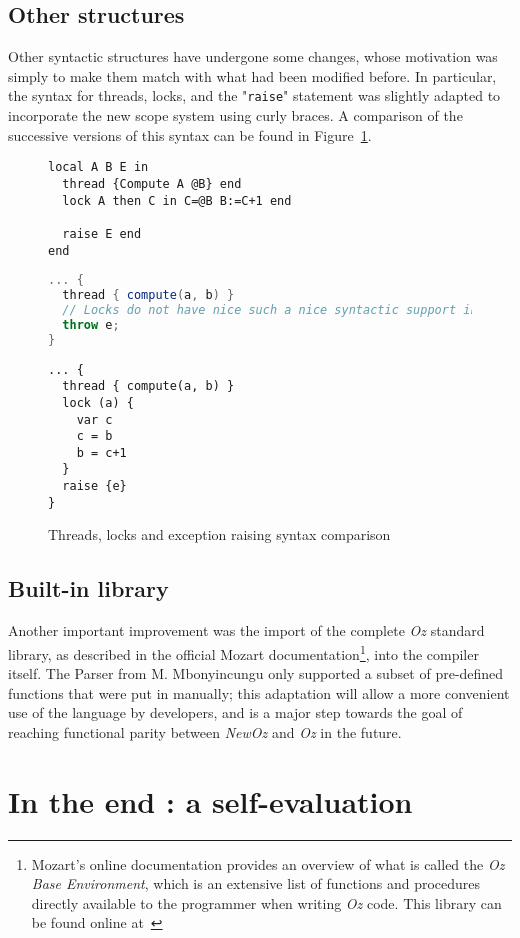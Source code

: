 \subsection{Other structures}
Other syntactic structures have undergone some changes, whose motivation was simply to make them match with what had been modified before.
In particular, the syntax for threads, locks, and the "\texttt{raise}" statement was slightly adapted to incorporate the new scope system using curly braces.\newline
A comparison of the successive versions of this syntax can be found in Figure~\ref{fig:code-comp-other}.
\begin{figure}
    \noindent\begin{minipage}{.49\textwidth}
                 \begin{lstlisting}[title={Oz},language=oz]
local A B E in
  thread {Compute A @B} end
  lock A then C in C=@B B:=C+1 end

  raise E end
end
                 \end{lstlisting}
    \end{minipage}
    \hfill
    \noindent\begin{minipage}{.49\textwidth}
                 \begin{lstlisting}[title={Ozma},language=scala]
... {
  thread { compute(a, b) }
  // Locks do not have nice such a nice syntactic support in Scala
  throw e;
}
                 \end{lstlisting}
    \end{minipage}
    \begin{center}
    \noindent\begin{minipage}{.89\textwidth}
\begin{lstlisting}[title={NewOz 2020/2021},language=newoz]
... {
  thread { compute(a, b) }
  lock (a) {
    var c
    c = b
    b = c+1
  }
  raise {e}
}
\end{lstlisting}
    \end{minipage}
    \end{center}
\caption{Threads, locks and exception raising syntax comparison}
\label{fig:code-comp-other}
\end{figure}

\subsection{Built-in library}
Another important improvement was the import of the complete \textit{Oz} standard library, as described in the official Mozart documentation\footnote{Mozart's online documentation provides an overview of what is called the \textit{Oz Base Environment}, which is an extensive list of functions and procedures directly available to the programmer when writing \textit{Oz} code. This library can be found online at~\cite{mozart2doc}}, into the compiler itself.
The Parser from M. Mbonyincungu only supported a subset of pre-defined functions that were put in manually;
this adaptation will allow a more convenient use of the language by developers, and is a major step towards the goal of reaching functional parity between \textit{NewOz} and \textit{Oz} in the future.

\section{In the end : a self-evaluation}\label{sec:ch2-evaluation}